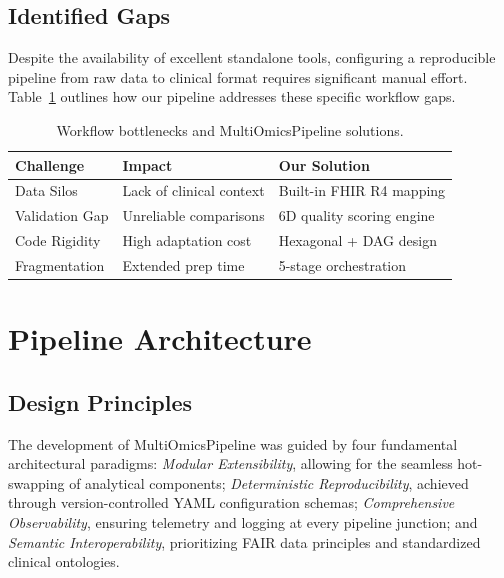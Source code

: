 \documentclass[sigconf,nonacm]{acmart}
\begin{document}
\subsection{Identified Gaps}
Despite the availability of excellent standalone tools, configuring a reproducible pipeline from raw data to clinical format requires significant manual effort. Table~\ref{tab:gaps} outlines how our pipeline addresses these specific workflow gaps.

\begin{table}[h]
\caption{Workflow bottlenecks and MultiOmicsPipeline solutions.}\label{tab:gaps}
\centering
\small
\renewcommand{\arraystretch}{1.4}
\begin{tabularx}{\columnwidth}{l X X}
\toprule
\rowcolor{headergray} \textbf{Challenge} & \textbf{Impact} & \textbf{Our Solution} \\
\midrule
Data Silos      & Lack of clinical context   & Built-in FHIR R4 mapping \\
\rowcolor{rowgray} Validation Gap  & Unreliable comparisons     & 6D quality scoring engine \\
Code Rigidity   & High adaptation cost       & Hexagonal + DAG design \\
\rowcolor{rowgray} Fragmentation   & Extended prep time         & 5-stage orchestration \\
\bottomrule
\end{tabularx}
\end{table}

\section{Pipeline Architecture}

\subsection{Design Principles}
The development of MultiOmicsPipeline was guided by four fundamental architectural paradigms: \emph{Modular Extensibility}, allowing for the seamless hot-swapping of analytical components; \emph{Deterministic Reproducibility}, achieved through version-controlled YAML configuration schemas; \emph{Comprehensive Observability}, ensuring telemetry and logging at every pipeline junction; and \emph{Semantic Interoperability}, prioritizing FAIR data principles and standardized clinical ontologies.
\end{document}
